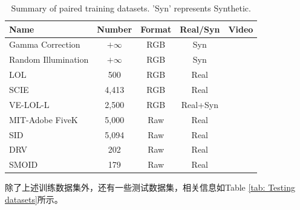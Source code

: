 \documentclass[letterpaper,12pt]{article}
\begin{document}
		\begin{table}[!htbp]
		\centering
		\tiny
			\begin{tabular}{>{\centering\arraybackslash}m{2.5cm}|c|c|c|c}

				\hline
				
				\textbf{Name} & \textbf{Number} & \textbf{Format} & \textbf{Real/Syn} & \textbf{Video} \\
				
				\hline
				
				Gamma Correction & $+\infty$ & RGB & Syn & \\
				
				Random Illumination & $+\infty$ & RGB & Syn & \\
				
				\hline
				
				LOL & 500 & RGB & Real & \\
	
				SCIE & 4,413 & RGB & Real & \\
				
				VE-LOL-L & 2,500 & RGB & Real+Syn & \\
				
				MIT-Adobe FiveK & 5,000 & Raw & Real & \\
				
				SID & 5,094 & Raw & Real & \\
				
				DRV & 202 & Raw & Real & \checkmark  \\
				
				SMOID & 179 & Raw & Real & \checkmark  \\
				
				\hline
				
			\end{tabular}
		\captionsetup{font=scriptsize} %
		\caption{\label{tab: Paired_training_datases}
			Summary of paired training datasets. 'Syn' represents Synthetic.} %
		
	\end{table}
	
	除了上述训练数据集外，还有一些测试数据集，相关信息如Table \ref{tab: Testing datasets}所示。
	
\end{document}
